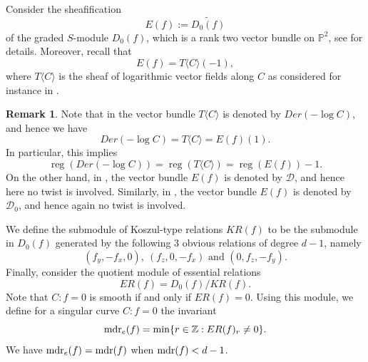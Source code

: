 \documentclass[12pt]{amsart}
\theoremstyle{plain}
\theoremstyle{definition}
\newtheorem{rk}[subsection]{Remark}
\numberwithin{equation}{section}
\newcommand{\D}{{\mathcal D}}
\newcommand{\Z}{\mathbb{Z}}
\newcommand{\PP}{\mathbb{P}}
\DeclareMathOperator{\reg}{reg}
\begin{document}
Consider the sheafification 
$$E(f):= \widetilde{D_0(f)} $$
of the graded $S$-module $D_0(f)$, which is a rank two vector bundle on $\PP^2$, see \cite{Se} for details. Moreover, recall that
\begin{equation} \label{equa1} 
E(f)=T\langle C \rangle (-1),
\end{equation}
where $T\langle C \rangle $ is the sheaf of logarithmic vector fields along $C$ as considered for instance in \cite{MaVa,Se}.

\begin{rk} \label{rkD1} 
Note that in \cite[Equation (1.1)]{STY} the vector bundle $T\langle C \rangle$ is denoted by $Der(-\log C)$, and hence we have
\begin{equation} \label{equa2} 
Der(-\log C)=T\langle C \rangle=E(f)(1).
\end{equation}
In particular, this implies
\begin{equation} \label{equa3} 
\reg(Der(-\log C))=\reg(T\langle C \rangle)=\reg(E(f))-1.
\end{equation}
On the other hand, in \cite[Corollary 3.5]{Sch0}, the vector bundle
$E(f)$ is denoted by $\D$, and hence here no twist is involved. Similarly, in
\cite[Formula (1)]{SchT1}, the vector bundle
$E(f)$ is denoted by $\D_0$, and hence again no twist is involved.
\end{rk}


We define the submodule of Koszul-type relations $KR(f)$ to be
the submodule in $D_0(f)$ generated by the following 3 obvious relations of degree $d-1$, namely
$$(f_y,-f_x,0), \  (f_z,0,-f_x)  \text{  and  } (0,f_z,-f_y).$$
Finally, consider the quotient module of essential relations
\begin{equation} \label{eqKR2} 
ER(f)= D_0(f)/KR(f).
\end{equation}
Note that $C:f=0$ is smooth if and only if $ER(f)=0$.
Using this module, we define for a singular curve $C:f=0$ the invariant
\begin{equation} \label{eqMDR} 
{\rm mdr}_e(f) =\min\{ r \in \Z:  ER(f)_r \ne 0 \}.
\end{equation}
We have ${\rm mdr}_e(f) ={\rm mdr}(f) $ when ${\rm mdr}(f) <d-1$.
\end{document}
